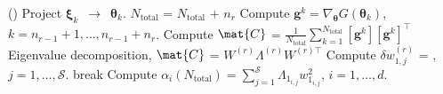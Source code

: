 \begin{breakablealgorithm}
\begin{algorithmic}[1]
                ()
		\State Project $\bm{\xi}_k$~$\rightarrow$~$\bm{\theta}_k$.
		\State $N_\text{total}$ = $N_\text{total}$ + $n_r$ 
		\State Compute $\bm{g}^k = \nabla_{\bm{\theta}}G(\bm\theta_k)$, 
             	$k=n_{r-1}+1, \ldots, n_{r-1}+n_r$.  
		\State Compute $\mat{C}$ = 
        	$\frac{1}{N_\text{total}}\sum\limits_{k=1}^{N_\text{total}}[\bm{g}^k][\bm{g}^k]^\top$
		\State Eigenvalue decomposition, $\mat{C}$ = $W^{(r)}\Lambda^{(r)} W^{(r)\top}$
		\State Compute $\delta w_{1,j}^{(r)}$ = 
                       , 
                       $j = 1,\ldots,\mathcal{S}$.
			\State break
		\EndIf
	\EndLoop
	\State Compute $\alpha_i(N_\text{total}) = \sum\limits_{j=1}^{\mathcal{S}} \Lambda_{1_{i,j}}w_{1_{i,j}}^2$,
	$i=1,\ldots,d$.
	
    \EndProcedure
  \end{algorithmic}
  \label{alg:grad}
\end{breakablealgorithm}
\bigskip

